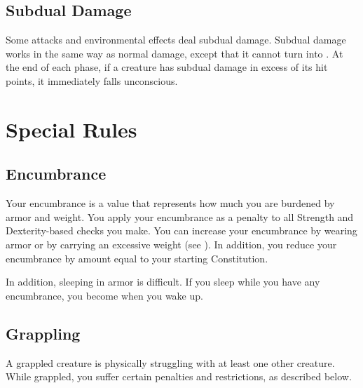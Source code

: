     \subsection{Subdual Damage}\label{Subdual Damage}
        Some attacks and environmental effects deal subdual damage.
        Subdual damage works in the same way as normal damage, except that it cannot turn into .
        At the end of each phase, if a creature has subdual damage in excess of its hit points, it immediately falls unconscious.


\section{Special Rules}
    \subsection{Encumbrance}\label{Encumbrance}
        Your encumbrance is a value that represents how much you are burdened by armor and weight.
        You apply your encumbrance as a penalty to all Strength and Dexterity-based checks you make.
        You can increase your encumbrance by wearing armor or by carrying an excessive weight (see ).
        In addition, you reduce your encumbrance by amount equal to your starting Constitution.

        In addition, sleeping in armor is difficult.
        If you sleep while you have any encumbrance, you become  when you wake up.


    \subsection{Grappling}\label{Grappling}
        A grappled creature is physically struggling with at least one other creature.
        While grappled, you suffer certain penalties and restrictions, as described below.

